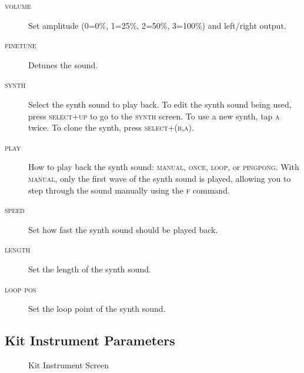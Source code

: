 \begin{description}
    \item[\textsc{volume}] Set amplitude (0=0\%, 1=25\%, 2=50\%, 3=100\%) and left/right output.
    \item[\textsc{finetune}] Detunes the sound.
    \item[\textsc{synth}] Select the synth sound to play back. To edit the synth sound being used, press \textsc{select+up} to go to the \textsc{synth} screen. To use a new synth, tap \textsc{a} twice. To clone the synth, press \textsc{select+(b,a)}.
    \item[\textsc{play}] How to play back the synth sound: \textsc{manual}, \textsc{once}, \textsc{loop}, or \textsc{pingpong}. With \textsc{manual}, only the first wave of the synth sound is played, allowing you to step through the sound manually using the \textsc{f} command.
	\item[\textsc{speed}] Set how fast the synth sound should be played back.
	\item[\textsc{length}] Set the length of the synth sound.
	\item[\textsc{loop pos}] Set the loop point of the synth sound.
\end{description}

\subsection{Kit Instrument Parameters}

\begin{figure}[hbtp]
	\begin{center}
	\end{center}
	\caption{Kit Instrument Screen}
\end{figure}

